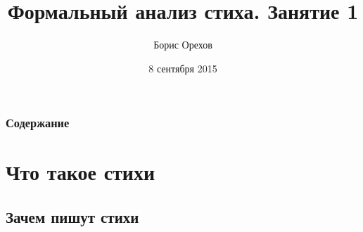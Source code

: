 \documentclass{beamer}
\title[Занятие 1]{Формальный анализ стиха. Занятие 1} %
\author{Борис Орехов} %
\institute[НИУ ВШЭ] %
{
НИУ Высшая школа экономики \\ %
\medskip
\textit{nevmenandr@gmail.com} %
}
\date{8 сентября 2015} %
\begin{document}
\begin{frame}
\titlepage %
\end{frame}



\begin{frame}
\frametitle{Содержание}  %
\tableofcontents %
\end{frame}




\section{Что такое стихи}\label{sec:intro} %

\subsection{Зачем пишут стихи}\label{sec:why} %

\end{document}
